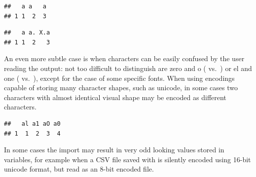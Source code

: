 \documentclass[krantz2]{krantz}\usepackage{knitr}%
\begin{document}
\begin{explainbox}
\begin{knitrout}\footnotesize
{}\color{fgcolor}\begin{kframe}
\begin{alltt}
\hlstd{(} \hlstd{=} \hlstd{,}  \hlstd{=} \hlstd{,}  \hlstd{=} \hlstd{,}  \hlstd{=} \hlstd{)}
\end{alltt}
\begin{verbatim}
##   a a   a
## 1 1  2  3
\end{verbatim}
\begin{alltt}
\hlstd{(} \hlstd{=} \hlstd{,}  \hlstd{=} \hlstd{,}  \hlstd{=} \hlstd{)}
\end{alltt}
\begin{verbatim}
##   a a. X.a
## 1 1  2   3
\end{verbatim}
\end{kframe}
\end{knitrout}

An even more subtle case is when characters can be easily confused by the user reading the output: not too difficult to distinguish are zero and o ( vs.\ ) or el and one ( vs.\ ), except for the case of some specific fonts. When using encodings capable of storing many character shapes, such as unicode, in some cases two characters with almost identical visual shape may be encoded as different characters.

\begin{knitrout}\footnotesize
{}\color{fgcolor}\begin{kframe}
\begin{alltt}
\hlstd{(} \hlstd{=} \hlstd{,}  \hlstd{=} \hlstd{,}  \hlstd{=} \hlstd{,}  \hlstd{=} \hlstd{)}
\end{alltt}
\begin{verbatim}
##   al a1 aO a0
## 1  1  2  3  4
\end{verbatim}
\end{kframe}
\end{knitrout}

In some cases the import may result in very odd looking values stored in \Rlang variables, for example when a CSV file saved with  is silently encoded using 16-bit unicode format, but read as an 8-bit encoded file.


\end{explainbox}
\end{document}

